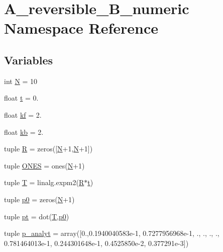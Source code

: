 \hypertarget{namespaceA__reversible__B__numeric}{\section{A\+\_\+reversible\+\_\+\+B\+\_\+numeric Namespace Reference}
\label{namespaceA__reversible__B__numeric}
}
\subsection*{Variables}
\begin{DoxyCompactItemize}
\item 
int \hyperlink{namespaceA__reversible__B__numeric_ac17162d2d7790ca7d605541ee4c919bb}{N} = 10
\item 
float \hyperlink{namespaceA__reversible__B__numeric_a63df2169b3cb7b9db0743a51320bbf4f}{t} = 0.
\item 
float \hyperlink{namespaceA__reversible__B__numeric_a772b5e72a16864c6d0d2895bf2bb5ada}{kf} = 2.
\item 
float \hyperlink{namespaceA__reversible__B__numeric_a2f4e77a45b10e727874ecd0a83be77fd}{kb} = 2.
\item 
tuple \hyperlink{namespaceA__reversible__B__numeric_a7095a52e98b19868ca09b3ea24726258}{R} = zeros(\mbox{[}\hyperlink{namespaceA__reversible__B__numeric_ac17162d2d7790ca7d605541ee4c919bb}{N}+1,\hyperlink{namespaceA__reversible__B__numeric_ac17162d2d7790ca7d605541ee4c919bb}{N}+1\mbox{]})
\item 
tuple \hyperlink{namespaceA__reversible__B__numeric_ab14192a58d248288a57a53a88e824aa1}{O\+N\+E\+S} = ones(\hyperlink{namespaceA__reversible__B__numeric_ac17162d2d7790ca7d605541ee4c919bb}{N}+1)
\item 
tuple \hyperlink{namespaceA__reversible__B__numeric_a238e2ae63555f68c3395add1edad1692}{T} = linalg.\+expm2(\hyperlink{namespaceA__reversible__B__numeric_a7095a52e98b19868ca09b3ea24726258}{R}$\ast$\hyperlink{namespaceA__reversible__B__numeric_a63df2169b3cb7b9db0743a51320bbf4f}{t})
\item 
tuple \hyperlink{namespaceA__reversible__B__numeric_ad5efb9fc14774d8a02dccd90d7978214}{p0} = zeros(\hyperlink{namespaceA__reversible__B__numeric_ac17162d2d7790ca7d605541ee4c919bb}{N}+1)
\item 
tuple \hyperlink{namespaceA__reversible__B__numeric_aae033c0920890d37257bb86daf8996f8}{pt} = dot(\hyperlink{namespaceA__reversible__B__numeric_a238e2ae63555f68c3395add1edad1692}{T},\hyperlink{namespaceA__reversible__B__numeric_ad5efb9fc14774d8a02dccd90d7978214}{p0})
\item 
tuple \hyperlink{namespaceA__reversible__B__numeric_a2f98730f45b559f9aece65c8682734bf}{p\+\_\+analyt} = array(\mbox{[}0.,0.\+1940040583e-\/1, 0.\+7277956968e-\/1, ., ., ., ., 0.\+781464013e-\/1, 0.\+244301648e-\/1, 0.\+4525850e-\/2, 0.\+377291e-\/3\mbox{]})
\end{DoxyCompactItemize}


